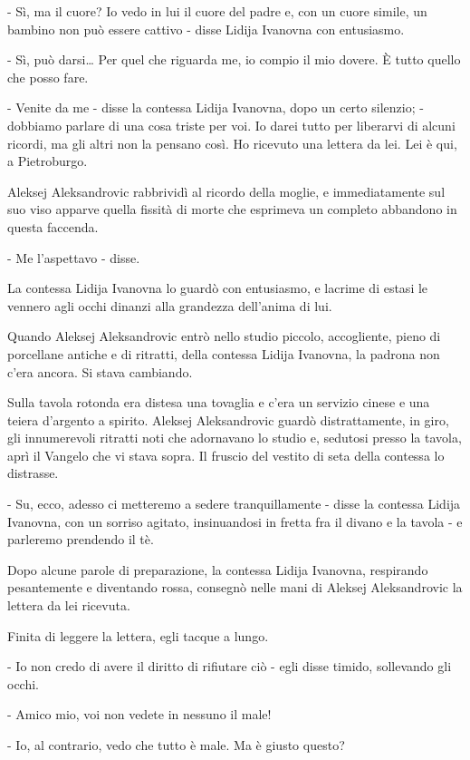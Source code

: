 - Sì, ma il cuore? Io vedo in lui il cuore del padre e, con un cuore simile, un bambino non può essere cattivo - disse Lidija Ivanovna con entusiasmo. 

- Sì, può darsi\ldots{} Per quel che riguarda me, io compio il mio dovere. È tutto quello che posso fare. 

- Venite da me - disse la contessa Lidija Ivanovna, dopo un certo silenzio; - dobbiamo parlare di una cosa triste per voi. Io darei tutto per liberarvi di alcuni ricordi, ma gli altri non la pensano così. Ho ricevuto una lettera da lei. Lei è qui, a Pietroburgo. 

Aleksej Aleksandrovic rabbrividì al ricordo della moglie, e immediatamente sul suo viso apparve quella fissità di morte che esprimeva un completo abbandono in questa faccenda. 

- Me l'aspettavo - disse. 

La contessa Lidija Ivanovna lo guardò con entusiasmo, e lacrime di estasi le vennero agli occhi dinanzi alla grandezza dell'anima di lui. 

Quando Aleksej Aleksandrovic entrò nello studio piccolo, accogliente, pieno di porcellane antiche e di ritratti, della contessa Lidija Ivanovna, la padrona non c'era ancora. Si stava cambiando. 

Sulla tavola rotonda era distesa una tovaglia e c'era un servizio cinese e una teiera d'argento a spirito. Aleksej Aleksandrovic guardò distrattamente, in giro, gli innumerevoli ritratti noti che adornavano lo studio e, sedutosi presso la tavola, aprì il Vangelo che vi stava sopra. Il fruscio del vestito di seta della contessa lo distrasse. 

- Su, ecco, adesso ci metteremo a sedere tranquillamente - disse la contessa Lidija Ivanovna, con un sorriso agitato, insinuandosi in fretta fra il divano e la tavola - e parleremo prendendo il tè. 

Dopo alcune parole di preparazione, la contessa Lidija Ivanovna, respirando pesantemente e diventando rossa, consegnò nelle mani di Aleksej Aleksandrovic la lettera da lei ricevuta. 

Finita di leggere la lettera, egli tacque a lungo. 

- Io non credo di avere il diritto di rifiutare ciò - egli disse timido, sollevando gli occhi. 

- Amico mio, voi non vedete in nessuno il male! 

- Io, al contrario, vedo che tutto è male. Ma è giusto questo? 

